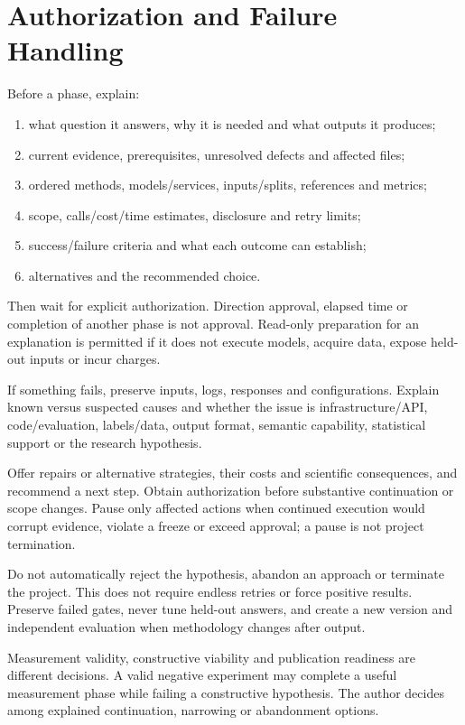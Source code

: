 \documentclass[11pt,a4paper]{article}
\begin{document}
\section{Authorization and Failure Handling}
Before a phase, explain:
\begin{enumerate}
\item what question it answers, why it is needed and what outputs it produces;
\item current evidence, prerequisites, unresolved defects and affected files;
\item ordered methods, models/services, inputs/splits, references and metrics;
\item scope, calls/cost/time estimates, disclosure and retry limits;
\item success/failure criteria and what each outcome can establish;
\item alternatives and the recommended choice.
\end{enumerate}
Then wait for explicit authorization. Direction approval, elapsed time or completion of another phase is not approval. Read-only preparation for an explanation is permitted if it does not execute models, acquire data, expose held-out inputs or incur charges.

If something fails, preserve inputs, logs, responses and configurations. Explain known versus suspected causes and whether the issue is infrastructure/API, code/evaluation, labels/data, output format, semantic capability, statistical support or the research hypothesis.

Offer repairs or alternative strategies, their costs and scientific consequences, and recommend a next step. Obtain authorization before substantive continuation or scope changes. Pause only affected actions when continued execution would corrupt evidence, violate a freeze or exceed approval; a pause is not project termination.

Do not automatically reject the hypothesis, abandon an approach or terminate the project. This does not require endless retries or force positive results. Preserve failed gates, never tune held-out answers, and create a new version and independent evaluation when methodology changes after output.

Measurement validity, constructive viability and publication readiness are different decisions. A valid negative experiment may complete a useful measurement phase while failing a constructive hypothesis. The author decides among explained continuation, narrowing or abandonment options.
\end{document}
